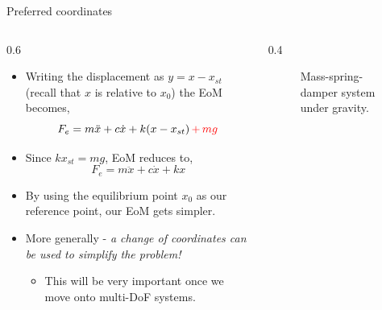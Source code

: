 \documentclass[11pt,aspectratio=169,handout]{beamer}
\begin{document}
\begin{frame}[c]{Preferred coordinates}
	\begin{columns}[T]
		\begin{column}{0.6\textwidth}
			\begin{itemize}
				\item Writing the displacement as $y = x-x_{st}$ (recall that $x$ is relative to $x_0$) the EoM becomes,
				\begin{equation}\label{EoM2}
					F_e = m\ddot{x} + c\dot{x} + k(x-x_{st}) {\,\color{red}+ \, mg}
				\end{equation}
			\item Since $kx_{st} = mg$, EoM reduces to,
			\begin{equation}\label{EoM2}
				F_e = m\ddot{x} + c\dot{x} + kx
			\end{equation}
			\item By using the equilibrium point $x_0$ as our reference point, our EoM gets simpler. 
			\item More generally - \textit{a change of coordinates can be used to simplify the problem!}
			\begin{itemize}
				\item This will be very important once we move onto multi-DoF systems. 
			\end{itemize}
			\end{itemize}
		\end{column}
		\begin{column}{0.4\textwidth}
			\begin{figure}
				
				\caption{Mass-spring-damper system under gravity.}
			\end{figure}
		\end{column}
	\end{columns}
\end{frame}
\end{document}
